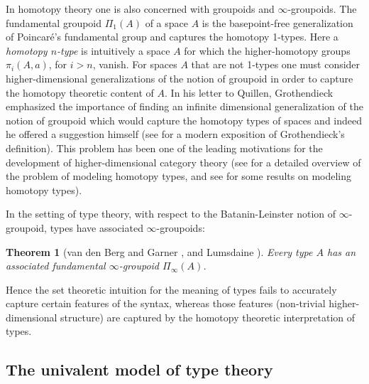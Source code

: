 \documentclass{amsart}
\newtheorem{theorem}{Theorem}[section]
\theoremstyle{definition}
\theoremstyle{remark}
\numberwithin{equation}{section}
\begin{document}
In homotopy theory one is also concerned with groupoids and
$\infty$-groupoids.  The fundamental groupoid $\Pi_{1}(A)$
of a space $A$ is the basepoint-free generalization of Poincar\'{e}'s
\cite{Poincare:1895vx} fundamental group and captures the homotopy
1-types.  Here a \emph{homotopy $n$-type}
is intuitively a space $A$ for which the higher-homotopy groups
$\pi_{i}(A,a)$, for $i>n$, vanish.  For spaces $A$ that are not
1-types one must consider higher-dimensional generalizations of
the notion of groupoid in order to capture the homotopy theoretic
content of $A$.  In his letter to Quillen, Grothendieck \cite{Grothendieck:2005wy} emphasized the importance of
finding an infinite dimensional generalization of the notion of
groupoid which would capture the homotopy types of spaces
and indeed he offered a suggestion himself (see \cite{Maltsiniotis}
for a modern exposition of Grothendieck's definition).  This problem has been one of
the leading motivations for the development of higher-dimensional
category theory (see \cite{Baues:1995js} for a
detailed overview of the problem of modeling homotopy types, and see
\cite{Loday:1982vg,Kapranov:1991uw,Simpson:1998wi,Tamsamani:1999ia,Cisinski:2007by}
for some results on modeling homotopy types).

In the setting of type theory, with respect to the Batanin-Leinster
\cite{Batanin:1998kp,Leinster:2004fi} notion of $\infty$-groupoid,
types have associated $\infty$-groupoids:
\begin{theorem}[van den Berg and Garner \cite{vandenBerg:2011ec}, and
  Lumsdaine \cite{Lumsdaine:2010ew}]
  Every type $A$ has an associated fundamental $\infty$-groupoid $\Pi_{\infty}(A)$.
\end{theorem}
Hence the set theoretic intuition for
the meaning of types fails to accurately capture certain features of
the syntax, whereas those features (non-trivial higher-dimensional
structure) are captured by the homotopy theoretic interpretation of
types.

\subsection{The univalent model of type theory}\label{sec:univalent_model}
\end{document}
